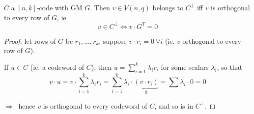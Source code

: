 \documentclass{article}
\theoremstyle{definition}
\newenvironment{lemma}[1]
{\renewcommand\theinnerlemma{#1}\innerlemma}
{\endinnerlemma}
\newcommand{\Vnq}{V(n, q)}
\begin{document}
\begin{lemma}{7.2} \label{7.2}
  $C$ a $[n,k]$-code with GM $G$. Then $v \in \Vnq$ belongs to $C^\perp$ iff $v$ is orthogonal to every row of $G$, ie.
  $$v \in C^\perp \Longleftrightarrow v \cdot G^T = 0$$
\end{lemma}
\begin{proof}
  let rows of $G$ be $r_1, \ldots, r_k$, suppose $v \cdot r_i = 0 ~\forall i$ (ie. $v$ orthogonal to every row of $G$).
  
  If $u \in C$ (ie. a codeword of $C$), then $u = \sum_{i=1}^k \lambda_i r_i$ for some scalars $\lambda_i$, so that
  $$v \cdot u = v \cdot \sum_{i=1}^k \lambda_i r_i = \sum_{i=1}^k \lambda_i \cdot \underbrace{(v \cdot r_i)}_{0} = \sum \lambda_i \cdot 0 = 0$$

  $\Longrightarrow~$ hence $v$ is orthogonal to every codeword of $C$, and so is in $C^\perp$.
\end{proof}
\end{document}
